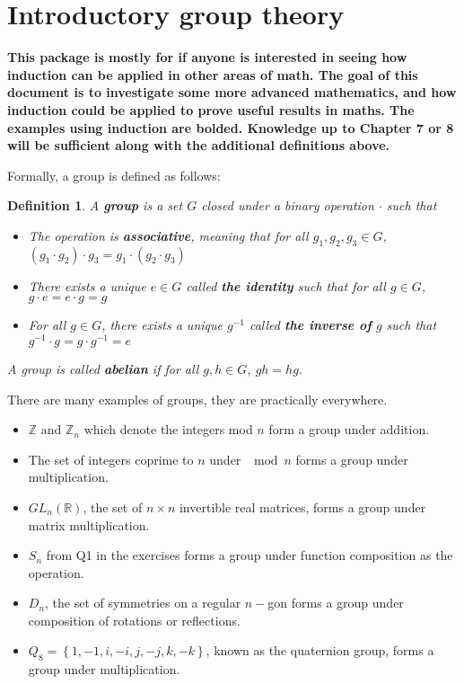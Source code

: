 \documentclass[letterpaper,12pt]{article}
\newcommand{\set}[1]{\left\{ #1 \right\}}
\newtheorem{definition}{Definition}[section]
\begin{document}
\section{Introductory group theory}
\textbf{This package is mostly for if anyone is interested in seeing how induction can be applied in other areas of math. The goal of this document is to investigate some more advanced mathematics, and how induction could be applied to prove useful results in maths. The examples using induction are bolded. Knowledge up to Chapter 7 or 8 will be sufficient along with the additional definitions above.} \par
Formally, a group is defined as follows:
\setcounter{section}{1}
\begin{definition}{1}
    A \textbf{group} is a set $G$ closed under a binary operation $\cdot$ such that \begin{itemize}
        \item The operation is \textbf{associative}, meaning that for all $g_1,g_2,g_3 \in G$, $(g_1 \cdot g_2)\cdot g_3 = g_1 \cdot (g_2 \cdot g_3)$
        \item There exists a unique $e \in G$ called \textbf{the identity} such that for all $g \in G$, $g \cdot e = e \cdot g = g$
        \item For all $g \in G$, there exists a unique $g^{-1}$ called \textbf{the inverse of} $g$ such that $g^{-1} \cdot g = g \cdot g^{-1} = e$
    \end{itemize}
    A group is called \textbf{abelian} if for all $g,h \in G$, $gh=hg$.
\end{definition}
There are many examples of groups, they are practically everywhere. \begin{itemize}
    \item $\mathbb{Z}$ and $\mathbb{Z}_n$ which denote the integers mod $n$ form a group under addition.
    \item The set of integers coprime to $n$ under $\mod n$ forms a group under multiplication.
    \item $GL_n(\mathbb{R})$, the set of $n\times n$ invertible real matrices, forms a group under matrix multiplication.
    \item $S_n$ from Q1 in the exercises forms a group under function composition as the operation.
    \item $D_n$, the set of symmetries on a regular $n-$gon forms a group under composition of rotations or reflections.
    \item $Q_8 = \set{1,-1,i,-i,j,-j,k,-k}$, known as the quaternion group, forms a group under multiplication.
\end{itemize}
\end{document}
